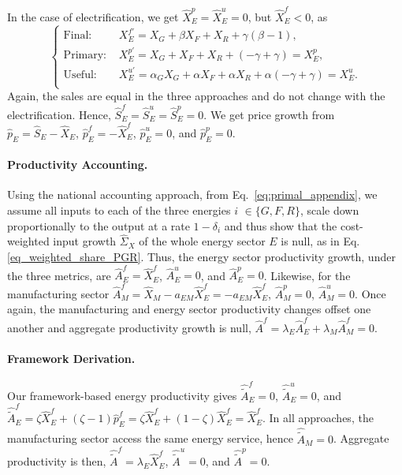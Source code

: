 \documentclass[11pt]{article}
\begin{document}
In the case of electrification, we get $\hat{X}_E^p=\hat{X}_E^u=0$, but $\hat{X}_E^f<0$, as
\begin{equation*}
    \begin{cases}
        \text{Final: }& X_E^{f'}=X_G+\beta X_F+X_R + \gamma(\beta-1),\\
         \text{Primary: }& X_E^{p'}= X_G+ X_F+X_R +  (-\gamma+\gamma)=X_E^p, \\
        \text{Useful: }& X_E^{u'}=\alpha_G X_G+ \alpha X_F+\alpha X_R + \alpha(-\gamma + \gamma )= X_E^u.  \\
    \end{cases}
\end{equation*}
Again, the sales are equal in the three approaches and do not change with the electrification. Hence, $\hat{S}_E^f=\hat{S}_E^u=\hat{S}_E^p=0$. We get price growth from $\hat{p}_E=\hat{S}_E - \hat{X}_E $, $\hat{p}_E^f = -\hat{X}_E^f$, 
 $\hat{p}_E^u = 0$, and $\hat{p}_E^p = 0$.

\paragraph{Productivity Accounting.} Using the national accounting approach, from Eq.~\ref{eq:primal_appendix},  we assume all inputs to each of the three energies $i$ $\in \{G,F,R\}$, scale down proportionally to the output at a rate $1-\delta_i$ and thus show that the cost-weighted input growth $\hat{\Sigma}_X$ of the whole energy sector $E$ is null, as in Eq. \eqref{eq_weighted_share_PGR}. Thus, the energy sector productivity growth, under the three metrics, are $\hat{A}_E^f = \hat{X}_E^f$, $\hat{A}_E^u = 0$, and $\hat{A}_E^p = 0$. Likewise, for the manufacturing sector $
\hat{A}_M^f = \hat{X}_M-a_{EM}\hat{X}_E^f= -a_{EM}\hat{X}_E^f$, $\hat{A}_M^p = 0$, $\hat{A}_M^u = 0$.
Once again, the manufacturing and energy sector productivity changes offset one another and aggregate productivity growth is null, $\hat{A}^f=\lambda_E \hat{A}_E^f+\lambda_M \hat{A}_M^f=0$.

\paragraph{Framework Derivation.}

Our framework-based energy productivity gives $\hat{\tilde{A}}_E^f = 0$, $\hat{\tilde{A}}_E^u = 0$, and  $\hat{\tilde{A}}_E^f=\zeta \hat{X}_E^f+(\zeta-1) \hat{p}_E^f=\zeta \hat{X}_E^f+(1-\zeta) \hat{X}_E^f=\hat{X}_E^f$.
In all approaches, the manufacturing sector access the same energy service, hence $\hat{\tilde{A}}_M=0$. Aggregate productivity is then, $\hat{\tilde{A}}^f=\lambda_E \hat{X}_E^f$, $\hat{\tilde{A}}^u=0$, and 
$\hat{\tilde{A}}^p = 0$.



\tiny
\renewcommand\bibname{References}


\normalsize
\end{document}
